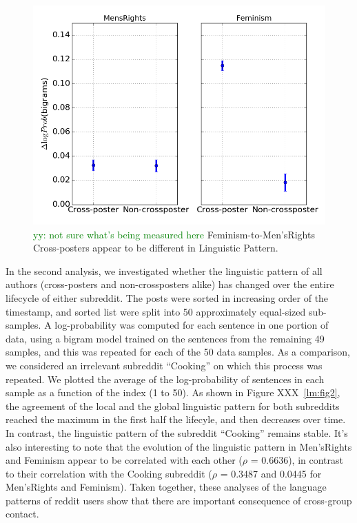 \documentclass[letterpaper]{article}
\newcommand{\yy}[1]{{\textcolor{green}{yy: #1}}}
\begin{document}
\begin{figure}[ht]
    \centering
    \includegraphics[scale = 0.4]{LM_figure_1_2}
    \caption{\yy{not sure what's being measured here} Feminism-to-Men'sRights Cross-posters appear to be different in Linguistic Pattern.}
    \label{lm:fig1_2}
\end{figure}

In the second analysis, we investigated whether the linguistic pattern of all authors (cross-posters and non-crossposters alike) has changed over the entire lifecycle of either subreddit. The posts were sorted in increasing order of the timestamp, and sorted list were split into 50 approximately equal-sized sub-samples. A log-probability was computed for each sentence in one portion of data, using a bigram model trained on the sentences from the remaining 49 samples, and this was repeated for each of the 50 data samples. As a comparison, we considered an irrelevant subreddit ``Cooking'' on which this process was repeated. We plotted the average of the log-probability of sentences in each sample as a function of the index (1 to 50). As shown in Figure XXX~\ref{lm:fig2}, the agreement of the local and the global linguistic pattern for both subreddits reached the maximum in the first half the lifecyle, and then decreases over time. In contrast, the linguistic pattern of the subreddit ``Cooking'' remains stable. It's also interesting to note that the evolution of the linguistic pattern in Men'sRights and Feminism appear to be correlated with each other ($\rho$ = 0.6636), in contrast to their correlation with the Cooking subreddit ($\rho$ = 0.3487 and 0.0445 for Men'sRights and Feminism). Taken together, these analyses of the language patterns of reddit users show that there are important consequence of cross-group contact.
\end{document}
